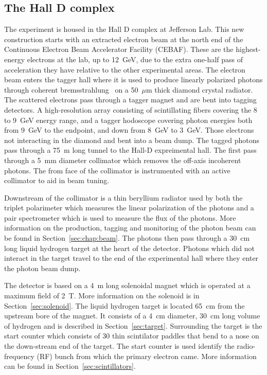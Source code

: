 \subsection[The Hall D complex]{The Hall D complex \label{sec:gluexexperiment:complex}}
The \gx{} experiment is housed in the Hall D complex at Jefferson Lab. This new construction starts with an extracted electron beam at the north end of the Continuous Electron Beam Accelerator Facility (CEBAF). These are the highest-energy electrons at the lab, up to 12~GeV, due to the extra one-half pass of acceleration they have relative to the other experimental areas. The electron beam enters the tagger hall where it is used to produce linearly polarized photons through coherent bremsstrahlung~\cite{} on a 50~$\mu$m thick diamond crystal radiator. The scattered electrons pass through a tagger magnet and are bent into tagging detectors. A high-resolution array consisting of scintillating fibers covering the 8 to 9~GeV energy range, and a tagger hodoscope covering photon energies both from 9~GeV to the endpoint, and down from 8~GeV to 3~GeV. Those electrons not interacting in the diamond and bent into a beam dump. The tagged photons pass through a 75~m long tunnel to the Hall-D expreimental hall. The first pass through a 5~mm diameter collimator which removes the off-axis incoherent photons. The from face of the collimator is instrumented with an active collimator to aid in beam tuning. 

Downstream of the collimator is a thin beryllium radiator used by both the triplet polarimeter which measures the linear polarization of the photons and a pair spectrometer which is used to measure the flux of the photons. More information on the production, tagging and monitoring of the photon beam can be found in Section~\ref{sec:chap:beam}. The photons then pass through a 30~cm long liquid hydrogen target at the heart of the \gx{} detector. Photons which did not interact in the target travel to the end of the experimental hall where they enter the photon beam dump.

The \gx{} detector is based on a 4~m long solenoidal magnet which is operated at a maximum field of 2~T. More information on the solenoid is in Section~\ref{sec:solenoid}. The liquid hydrogen target is located 65~cm from the upstream bore of the magnet. It consists of a 4~cm diameter, 30~cm long volume of hydrogen and is described in Section~\ref{sec:target}. Surrounding the target is the start counter which consists of 30 thin scintilator paddles that bend to a nose on the down-stream end of the target. The start counter is used identify the radio-frequency (RF) bunch from which the primary electron came. More information can be found in Section~\ref{sec:scintillators}. 

